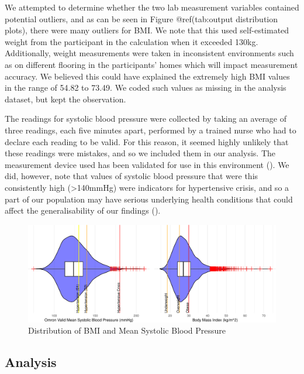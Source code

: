 \documentclass[
  11pt,
  twocolumn]{article}
\begin{document}
We attempted to determine whether the two lab measurement variables
contained potential outliers, and as can be seen in Figure
@ref(tab:output distribution plots), there were many outliers for BMI.
We note that this used self-estimated weight from the participant in the
calculation when it exceeded 130kg. Additionally, weight measurements
were taken in inconsistent environments such as on different flooring in
the participants' homes which will impact measurement accuracy. We
believed this could have explained the extremely high BMI values in the
range of 54.82 to 73.49. We coded such values as missing in the analysis
dataset, but kept the observation.

The readings for systolic blood pressure were collected by taking an
average of three readings, each five minutes apart, performed by a
trained nurse who had to declare each reading to be valid. For this
reason, it seemed highly unlikely that these readings were mistakes, and
so we included them in our analysis. The measurement device used has
been validated for use in this environment (). We did, however, note that values of systolic blood
pressure that were this consistently high (\textgreater140mmHg) were
indicators for hypertensive crisis, and so a part of our population may
have serious underlying health conditions that could affect the
generalisability of our findings ().

\begin{figure}[H]
\includegraphics{Coursework_files/figure-latex/output-distribution-plots-1} \caption{Distribution of BMI and Mean Systolic Blood Pressure}\label{fig:output-distribution-plots}
\end{figure}

\subsection{Analysis}\label{analysis}
\end{document}
